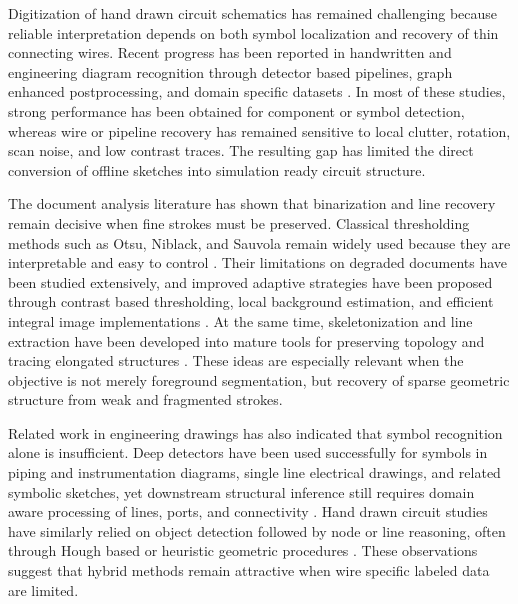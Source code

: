 Digitization of hand drawn circuit schematics has remained challenging because reliable interpretation depends on both symbol localization and recovery of thin connecting wires. Recent progress has been reported in handwritten and engineering diagram recognition through detector based pipelines, graph enhanced postprocessing, and domain specific datasets \cite{Thoma2021,Rachala2022,Shen2023,Schaefer2021,Elyan2020,Lee2020,Yang2024,Hemker2024,MorenoGarcia2024}. In most of these studies, strong performance has been obtained for component or symbol detection, whereas wire or pipeline recovery has remained sensitive to local clutter, rotation, scan noise, and low contrast traces. The resulting gap has limited the direct conversion of offline sketches into simulation ready circuit structure.

The document analysis literature has shown that binarization and line recovery remain decisive when fine strokes must be preserved. Classical thresholding methods such as Otsu, Niblack, and Sauvola remain widely used because they are interpretable and easy to control \cite{Otsu1979,Niblack1986,Sauvola2000}. Their limitations on degraded documents have been studied extensively, and improved adaptive strategies have been proposed through contrast based thresholding, local background estimation, and efficient integral image implementations \cite{Gatos2006,Shafait2008,Su2013}. At the same time, skeletonization and line extraction have been developed into mature tools for preserving topology and tracing elongated structures \cite{ZhangSuen1984,Lam1992,DudaHart1972,Gioi2010}. These ideas are especially relevant when the objective is not merely foreground segmentation, but recovery of sparse geometric structure from weak and fragmented strokes.

Related work in engineering drawings has also indicated that symbol recognition alone is insufficient. Deep detectors have been used successfully for symbols in piping and instrumentation diagrams, single line electrical drawings, and related symbolic sketches, yet downstream structural inference still requires domain aware processing of lines, ports, and connectivity \cite{Elyan2020,Lee2020,Yang2024,Hemker2024,MorenoGarcia2024}. Hand drawn circuit studies have similarly relied on object detection followed by node or line reasoning, often through Hough based or heuristic geometric procedures \cite{Rachala2022,Rabby2019}. These observations suggest that hybrid methods remain attractive when wire specific labeled data are limited.

